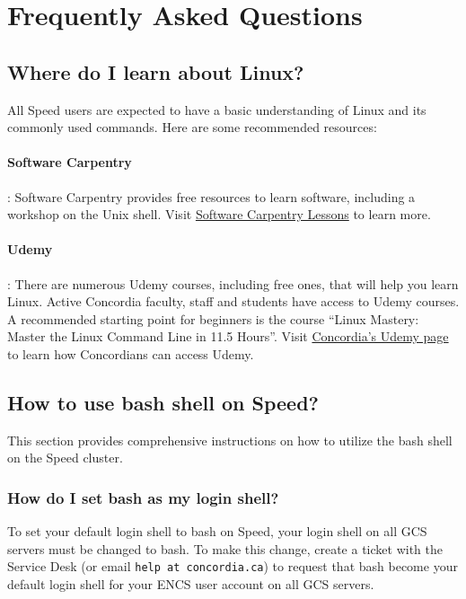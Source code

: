 \section{Frequently Asked Questions}
\label{sect:faqs}

\subsection{Where do I learn about Linux?}
\label{sect:faqs-linux}

All Speed users are expected to have a basic understanding of Linux and its commonly used commands.
Here are some recommended resources:

\paragraph*{Software Carpentry}:
Software Carpentry provides free resources to learn software, including a workshop on the Unix shell.
Visit \href{https://software-carpentry.org/lessons/}{Software Carpentry Lessons} to learn more.

\paragraph*{Udemy}:
There are numerous Udemy courses, including free ones, that will help you learn Linux.
Active Concordia faculty, staff and students have access to Udemy courses.
A recommended starting point for beginners is the course ``Linux Mastery: Master the Linux Command Line in 11.5 Hours''.
Visit \href{https://www.concordia.ca/it/services/udemy.html}{Concordia's Udemy page} to learn how Concordians can access Udemy.

\subsection{How to use bash shell on Speed?}
\label{sect:faqs-bash}

This section provides comprehensive instructions on how to utilize the bash shell on the Speed cluster.

\subsubsection{How do I set bash as my login shell?}
To set your default login shell to bash on Speed, your login shell on all GCS servers must be changed to bash.
To make this change, create a ticket with the Service Desk (or email \texttt{help at concordia.ca}) to
request that bash become your default login shell for your ENCS user account on all GCS servers.


